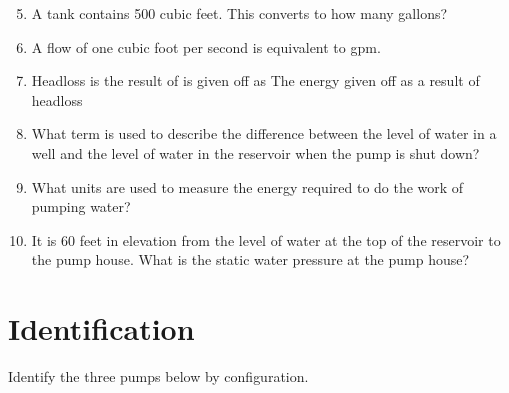 \documentclass[10pt]{article}
\begin{document}
\begin{enumerate}
  \setcounter{enumi}{4}
  \item A tank contains 500 cubic feet. This converts to how many gallons?

  \item A flow of one cubic foot per second is equivalent to gpm.

  \item Headloss is the result of is given off as The energy given off as a result of headloss

  \item What term is used to describe the difference between the level of water in a well and the level of water in the reservoir when the pump is shut down?

  \item What units are used to measure the energy required to do the work of pumping water?

  \item It is 60 feet in elevation from the level of water at the top of the reservoir to the pump house. What is the static water pressure at the pump house?

\end{enumerate}
\section{Identification}
Identify the three pumps below by configuration.
\end{document}
